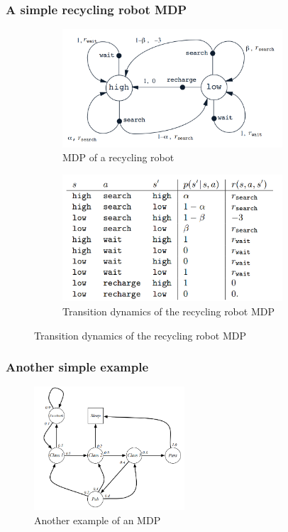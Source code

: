 \begin{frame}
    \frametitle{A simple recycling robot MDP}
    \begin{figure}
        \centering
        \begin{subfigure}{0.45\textwidth}
            \centering
            \includegraphics[width=0.9\textwidth]{./imgs/img_rl_mdp_robot_cleaner_1.png}
            \caption{MDP of a recycling robot}
        \end{subfigure}
        \pause
        \begin{subfigure}{0.45\textwidth}
            \centering
            \includegraphics[width=0.9\textwidth]{./imgs/img_rl_mdp_robot_cleaner_2.png}
            \caption{Transition dynamics of the recycling robot MDP}
        \end{subfigure}
    \end{figure}
\end{frame}

\begin{frame}
    \frametitle{Another simple example}
    \begin{figure}
        \centering
        \includegraphics[width=0.5\textwidth]{./imgs/img_rl_mdp_student_example.png}
        \caption{Another example of an MDP}
    \end{figure}
\end{frame}

